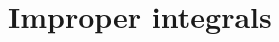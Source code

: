 \documentclass[preview]{standalone}
\begin{document}
\genpage

\section{Improper integrals}
\end{document}
